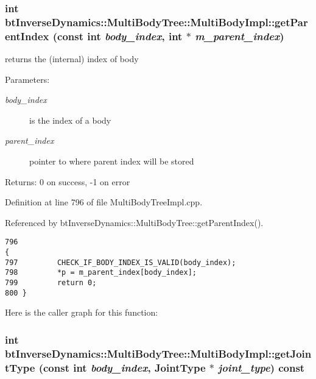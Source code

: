  \hypertarget{classbt_inverse_dynamics_1_1_multi_body_tree_1_1_multi_body_impl_ce5ed2225ecc96810f7b385ada048dd6}{
\subsubsection[getParentIndex]{\setlength{\rightskip}{0pt plus 5cm}int btInverseDynamics::MultiBodyTree::MultiBodyImpl::getParentIndex (const int {\em body\_\-index}, \/  int $\ast$ {\em m\_\-parent\_\-index})}}
\label{classbt_inverse_dynamics_1_1_multi_body_tree_1_1_multi_body_impl_ce5ed2225ecc96810f7b385ada048dd6}


returns the (internal) index of body \begin{Desc}
\item[Parameters:]
\begin{description}
\item[{\em body\_\-index}]is the index of a body \item[{\em parent\_\-index}]pointer to where parent index will be stored \end{description}
\end{Desc}
\begin{Desc}
\item[Returns:]0 on success, -1 on error \end{Desc}
 

Definition at line 796 of file MultiBodyTreeImpl.cpp.

Referenced by btInverseDynamics::MultiBodyTree::getParentIndex().

\begin{Code}\begin{verbatim}796                                                                            {
797         CHECK_IF_BODY_INDEX_IS_VALID(body_index);
798         *p = m_parent_index[body_index];
799         return 0;
800 }
\end{verbatim}
\end{Code}




Here is the caller graph for this function:\hypertarget{classbt_inverse_dynamics_1_1_multi_body_tree_1_1_multi_body_impl_74c65f858a7a5c93466f6d02a23b4663}{
\subsubsection[getJointType]{\setlength{\rightskip}{0pt plus 5cm}int btInverseDynamics::MultiBodyTree::MultiBodyImpl::getJointType (const int {\em body\_\-index}, \/  JointType $\ast$ {\em joint\_\-type}) const}}
\label{classbt_inverse_dynamics_1_1_multi_body_tree_1_1_multi_body_impl_74c65f858a7a5c93466f6d02a23b4663}


